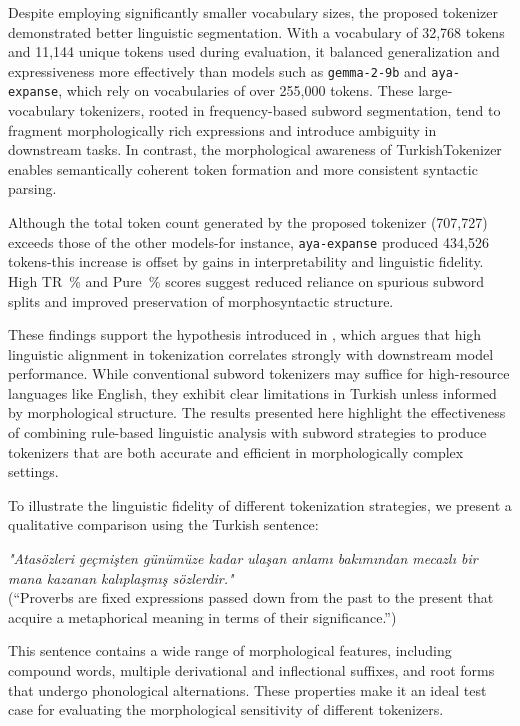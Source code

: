 Despite employing significantly smaller vocabulary sizes, the proposed tokenizer demonstrated better linguistic segmentation. With a vocabulary of 32,768 tokens and 11,144 unique tokens used during evaluation, it balanced generalization and expressiveness more effectively than models such as \texttt{gemma-2-9b} and \texttt{aya-expanse}, which rely on vocabularies of over 255,000 tokens. These large-vocabulary tokenizers, rooted in frequency-based subword segmentation, tend to fragment morphologically rich expressions and introduce ambiguity in downstream tasks. In contrast, the morphological awareness of TurkishTokenizer enables semantically coherent token formation and more consistent syntactic parsing.

Although the total token count generated by the proposed tokenizer (707,727) exceeds those of the other models-for instance, \texttt{aya-expanse} produced 434,526 tokens-this increase is offset by gains in interpretability and linguistic fidelity. High TR~\% and Pure~\% scores suggest reduced reliance on spurious subword splits and improved preservation of morphosyntactic structure.

These findings support the hypothesis introduced in \cite{bayram_tokenization_2025}, which argues that high linguistic alignment in tokenization correlates strongly with downstream model performance. While conventional subword tokenizers may suffice for high-resource languages like English, they exhibit clear limitations in Turkish unless informed by morphological structure. The results presented here highlight the effectiveness of combining rule-based linguistic analysis with subword strategies to produce tokenizers that are both accurate and efficient in morphologically complex settings.

To illustrate the linguistic fidelity of different tokenization strategies, we present a qualitative comparison using the Turkish sentence:

\textit{"Atasözleri geçmişten günümüze kadar ulaşan anlamı bakımından mecazlı bir mana kazanan kalıplaşmış sözlerdir."} \\
(“Proverbs are fixed expressions passed down from the past to the present that acquire a metaphorical meaning in terms of their significance.”)

This sentence contains a wide range of morphological features, including compound words, multiple derivational and inflectional suffixes, and root forms that undergo phonological alternations. These properties make it an ideal test case for evaluating the morphological sensitivity of different tokenizers.

